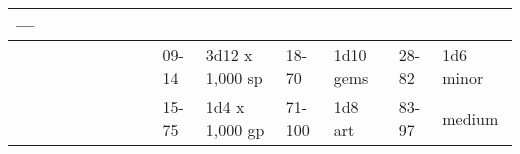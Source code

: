 \begin{longtable}{llllllllllllll}
{\begin{minipage}[t]{0.469in}
---\end{minipage}}\\
\hline
\multicolumn{8}{p{1.150in}|}{\begin{minipage}[t]{1.150in}\centering
\end{minipage}} & \multicolumn{1}{|p{0.393in}|}{\begin{minipage}[t]{0.393in}\raggedright
09-14\end{minipage}} & \multicolumn{1}{p{0.469in}|}{\begin{minipage}[t]{0.469in}\raggedright
3d12 x 1,000 sp\end{minipage}} & \multicolumn{1}{p{0.923in}|}{\begin{minipage}[t]{0.923in}\raggedright
18-70\end{minipage}} & \multicolumn{1}{p{0.469in}|}{\begin{minipage}[t]{0.469in}\raggedright
1d10 gems\end{minipage}} & \multicolumn{1}{p{0.626in}|}{\begin{minipage}[t]{0.626in}\raggedright
28-82\end{minipage}} & \multicolumn{1}{p{0.469in}|}{\begin{minipage}[t]{0.469in}\centering
1d6 minor\end{minipage}}\\
\hline
\multicolumn{8}{p{1.150in}|}{\begin{minipage}[t]{1.150in}\centering
\end{minipage}} & \multicolumn{1}{|p{0.393in}|}{\begin{minipage}[t]{0.393in}\raggedright
15-75\end{minipage}} & \multicolumn{1}{p{0.469in}|}{\begin{minipage}[t]{0.469in}\raggedright
1d4 x 1,000 gp\end{minipage}} & \multicolumn{1}{p{0.923in}|}{\begin{minipage}[t]{0.923in}\raggedright
71-100\end{minipage}} & \multicolumn{1}{p{0.469in}|}{\begin{minipage}[t]{0.469in}\raggedright
1d8 art\end{minipage}} & \multicolumn{1}{p{0.626in}|}{\begin{minipage}[t]{0.626in}\raggedright
83-97\end{minipage}} & \multicolumn{1}{p{0.469in}|}{\begin{minipage}[t]{0.469in}\centering
1 medium\end{minipage}}\\

\end{longtable}
